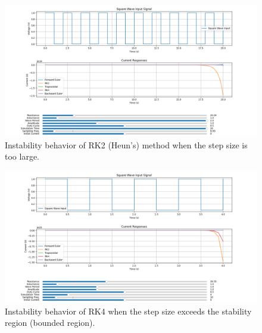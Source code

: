 \begin{figure}[H]
  \centering
  \includegraphics[width=\textwidth]{figs/instability_rk2.png}
  \caption{Instability behavior of RK2 (Heun's) method when the step size is too large.}
  \label{fig:instability_rk2}
\end{figure}


\begin{figure}[H]
  \centering
  \includegraphics[width=\textwidth]{figs/instability_rk4.png}
  \caption{Instability behavior of RK4 when the step size exceeds the stability region (bounded region).}
  \label{fig:instability_rk4}
\end{figure}
